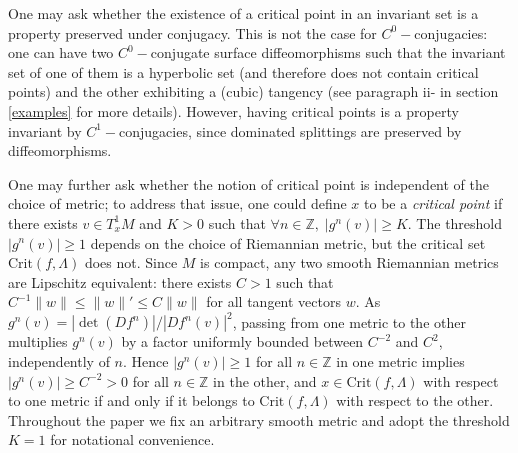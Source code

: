 \documentclass[a4paper,11pt]{article}
\theoremstyle{definition}
\def\ZZ{{\mathbb Z}}
\def\La{\Lambda}
\def\La{\Lambda}
\begin{document}
One may ask whether the existence of a critical point in an invariant set is a property preserved under conjugacy. This is not the case for $C^0-$conjugacies: one can have two $C^0-$conjugate surface diffeomorphisms such that the invariant set of one of them is a hyperbolic set (and therefore does not contain critical points) and the other exhibiting a (cubic) tangency (see paragraph ii- in section \ref{examples} for more details). However, having critical points is a property invariant by $C^1-$conjugacies, since  dominated splittings are preserved by diffeomorphisms. 

One may further ask whether the notion of critical point is independent of the choice of metric; to address that issue, one could define  $x$ to be  a \emph{critical point}
if there exists $v\in T^1_xM$ and $K>0$ such that
$\forall n\in \ZZ, \; |g^n(v)|\geq K.$ The threshold $|g^n(v)| \geq 1$ depends on the choice of Riemannian metric, but the critical set $\mathrm{Crit}(f,\Lambda)$ does not. Since $M$ is compact, any two smooth Riemannian metrics are Lipschitz equivalent: there exists $C > 1$ such that $C^{-1}\|w\| \leq \|w\|' \leq C\|w\|$ for all tangent vectors $w$. As $g^n(v) = |\det(Df^n)|/|Df^n(v)|^2$, passing from one metric to the other multiplies $g^n(v)$ by a factor uniformly bounded between $C^{-2}$ and $C^2$, independently of $n$. Hence $|g^n(v)| \geq 1$ for all $n \in \mathbb{Z}$ in one metric implies $|g^n(v)| \geq C^{-2} > 0$ for all $n \in \mathbb{Z}$ in the other, and $x \in \mathrm{Crit}(f,\Lambda)$ with respect to one metric if and only if it belongs to $\mathrm{Crit}(f,\Lambda)$ with respect to the other. Throughout the paper we fix an arbitrary smooth metric and adopt the threshold $K=1$ for notational convenience.







\end{document}
